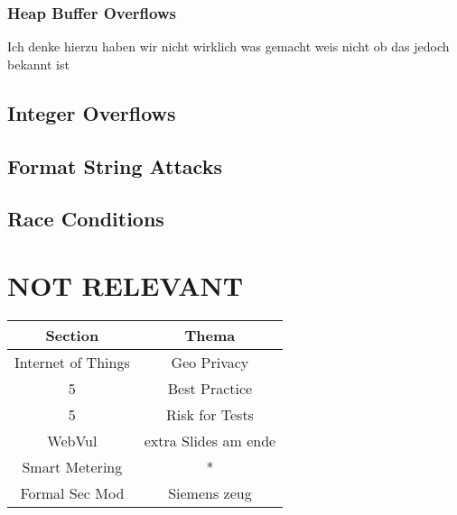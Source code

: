 \documentclass[a4paper, 12pt]{article}
\begin{document}
\subsubsection{Heap Buffer Overflows}
Ich denke hierzu haben wir nicht wirklich was gemacht weis nicht ob das jedoch bekannt ist 
\subsection{Integer Overflows}
\subsection{Format String Attacks}
\subsection{Race Conditions}

\section{NOT RELEVANT}
\begin{tabular}{|c|c|} \hline
\textbf{Section} & \textbf{Thema} \\ \hline
Internet of Things & Geo Privacy \\ \hline
5 & Best Practice \\ \hline
5 & Risk for Tests \\ \hline
WebVul & extra Slides am ende \\ \hline
Smart Metering & * \\ \hline
Formal Sec Mod & Siemens zeug \\ \hline



\end{tabular}
\end{document}
